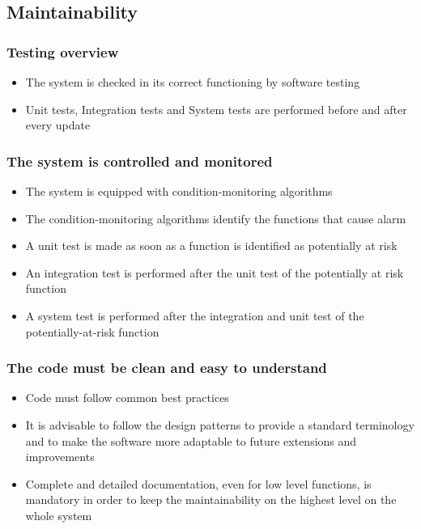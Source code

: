 \subsection{Maintainability}
\subsubsection{Testing overview}
\begin{itemize}
  \item The system is checked in its correct functioning by software testing
  \item Unit tests, Integration tests and System tests are performed before and after every update
\end{itemize}

\subsubsection{The system is controlled and monitored}
\begin{itemize}
  \item The system is equipped with condition-monitoring algorithms 
  \item The condition-monitoring algorithms identify the functions that cause alarm
  \item A unit test is made as soon as a function is identified as potentially at risk
  \item An integration test is performed after the unit test of the potentially at risk function
  \item A system test is performed after the integration and unit test of the potentially-at-risk function
\end{itemize}

\subsubsection{The code must be clean and easy to understand}
\begin{itemize}
  \item Code must follow common best practices
  \item It is advisable to follow the design patterns to provide a standard terminology and to make the software more adaptable to future extensions and improvements
  \item Complete and detailed documentation, even for low level functions, is mandatory in order to keep the maintainability on the highest level on the whole system
\end{itemize}

